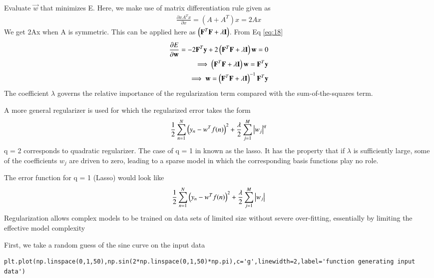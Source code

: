 \documentclass[journal,12pt,twocolumn]{IEEEtran}
\begin{document}
Evaluate $\vec{w}$ that minimizes E. Here, we make use of matrix differentiation rule given as
\begin{align}
    \frac{\partial xA^Tx}{\partial x} = (A + A^T)x = 2Ax
\end{align}
We get 2Ax when A is symmetric. This can be applied here as $\left(\mathbf{F}^T\mathbf{F} + \lambda\mathbf{I}\right)$. From Eq \eqref{eq:18}
\begin{align}
    \frac{\partial E}{\partial \mathbf{w}} = -2\mathbf{F}^T\mathbf{y} + 2\left(\mathbf{F}^T\mathbf{F} + \lambda\mathbf{I}\right)\mathbf{w} = 0\\
    \implies \left(\mathbf{F}^T\mathbf{F} + \lambda\mathbf{I}\right)\mathbf{w} = \mathbf{F}^T\mathbf{y}\\
    \implies \mathbf{w} = \left(\mathbf{F}^T\mathbf{F} + \lambda\mathbf{I}\right)^{-1}\mathbf{F}^T\mathbf{y}
\end{align}
The coefficient $\lambda$ governs the relative importance of the regularization term compared with the sum-of-the-squares term.

A more general regularizer is used for which the regularized error takes the form
\begin{align}
\frac{1}{2}\sum_{n=1}^{N}\left(y_{n} - w^T f(n)\right)^2 + \frac{\lambda}{2}\sum_{j=1}^{M}\left\vert w_{j}\right\vert^q
\end{align}
q = 2 corresponds to quadratic regularizer.
The case of q = 1 in known as the lasso. It has the property that if $\lambda$ is sufficiently large, some of the coefficients $w_{j}$ are driven to zero, leading to a sparse model in which the corresponding basis functions play no role.

The error function for q = 1 (Lasso) would look like 
\begin{align}
    \frac{1}{2}\sum_{n=1}^{N}\left(y_{n} - w^T f(n)\right)^2 + \frac{\lambda}{2}\sum_{j=1}^{M}\left\vert w_{j}\right\vert
\end{align}
Regularization allows complex models to be trained on data sets of limited size
without severe over-fitting, essentially by limiting the effective model complexity

First, we take a random guess of the sine curve on the input data
\begin{lstlisting}
plt.plot(np.linspace(0,1,50),np.sin(2*np.linspace(0,1,50)*np.pi),c='g',linewidth=2,label='function generating input data')
\end{lstlisting} 
\end{document}
